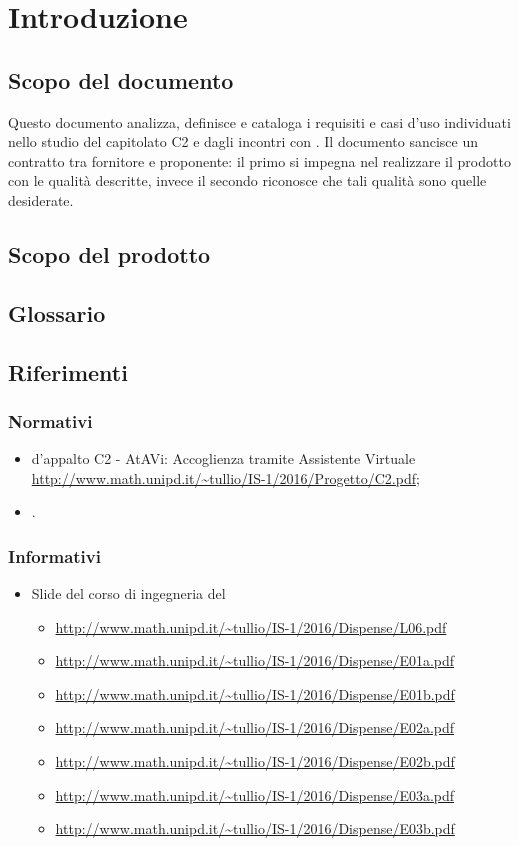\section{Introduzione}
 \subsection{Scopo del documento}
 Questo documento analizza, definisce e cataloga i requisiti e casi d'uso individuati nello studio del capitolato C2 e dagli incontri con \PROPONENTE. 
 Il documento sancisce un contratto tra fornitore e proponente: il primo si impegna nel realizzare il prodotto con le qualità descritte, invece il secondo riconosce che tali qualità sono quelle desiderate. 
 \subsection{Scopo del prodotto}
 \SCOPO
 \subsection{Glossario}
 \GLOSSARIO
 \subsection{Riferimenti}
  \subsubsection{Normativi}
  \begin{itemize}
  	\item {} d'appalto C2 - AtAVi: Accoglienza tramite Assistente Virtuale \\
  	\url{http://www.math.unipd.it/~tullio/IS-1/2016/Progetto/C2.pdf};
    \item \NPdoc.
  \end{itemize}
  \subsubsection{Informativi}
    \begin{itemize}
    	\item Slide del corso di ingegneria del 
    	\begin{itemize}
    		\item \url{http://www.math.unipd.it/~tullio/IS-1/2016/Dispense/L06.pdf}
    		\item \url{http://www.math.unipd.it/~tullio/IS-1/2016/Dispense/E01a.pdf}
    		\item \url{http://www.math.unipd.it/~tullio/IS-1/2016/Dispense/E01b.pdf}
    		\item \url{http://www.math.unipd.it/~tullio/IS-1/2016/Dispense/E02a.pdf}
    		\item \url{http://www.math.unipd.it/~tullio/IS-1/2016/Dispense/E02b.pdf}
    		\item \url{http://www.math.unipd.it/~tullio/IS-1/2016/Dispense/E03a.pdf}
    		\item \url{http://www.math.unipd.it/~tullio/IS-1/2016/Dispense/E03b.pdf}
    	\end{itemize}
    \end{itemize}